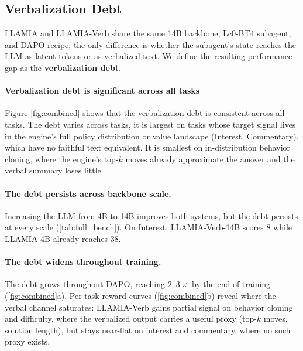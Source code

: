\subsection{Verbalization Debt}
\label{sec:results_vd}

LLAMIA and LLAMIA-Verb share the same 14B backbone, Lc0-BT4 subagent, and DAPO recipe; the only difference is whether the subagent's state reaches the LLM as latent tokens or as verbalized text. We define the resulting performance gap as the \textbf{verbalization debt}.

\paragraph{Verbalization debt is significant across all tasks}
Figure \ref{fig:combined} shows that the verbalization debt is consistent across all tasks. The debt varies across tasks, it is largest on tasks whose target signal lives in the engine's full policy distribution or value landscape (Interest, Commentary), which have no faithful text equivalent. It is smallest on in-distribution behavior cloning, where the engine's top-$k$ moves already approximate the answer and the verbal summary loses little.

\paragraph{The debt persists across backbone scale.}
Increasing the LLM from 4B to 14B improves both systems, but the debt persists at every scale (\cref{tab:full_bench}). On Interest, LLAMIA-Verb-14B scores $8$ while LLAMIA-4B already reaches $38$.

\paragraph{The debt widens throughout training.}
The debt grows throughout DAPO, reaching $2$--$3\times$ by the end of training (\cref{fig:combined}a). Per-task reward curves (\cref{fig:combined}b) reveal where the verbal channel saturates: LLAMIA-Verb gains partial signal on behavior cloning and difficulty, where the verbalized output carries a useful proxy (top-$k$ moves, solution length), but stays near-flat on interest and commentary, where no such proxy exists.


